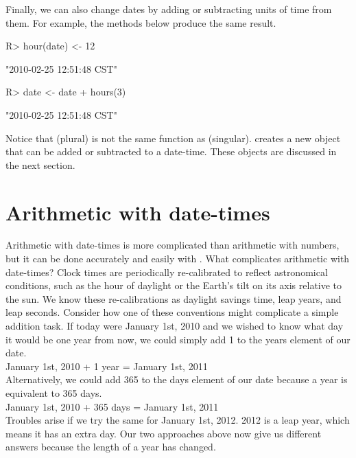 \documentclass[article]{jss}
\begin{document}
Finally, we can also change dates by adding or subtracting units of time from them. For example, the methods below produce the same result.

\begin{CodeInput}
R> hour(date) <-  12
\end{CodeInput}
\begin{CodeOutput}
[1] "2010-02-25 12:51:48 CST"
\end{CodeOutput}

\begin{CodeInput}
R> date <- date + hours(3)
\end{CodeInput}
\begin{CodeOutput}
[1] "2010-02-25 12:51:48 CST"
\end{CodeOutput}

Notice that  (plural) is not the same function as  (singular).  creates a new object that can be added or subtracted to a  date-time. These objects are discussed in the next section.

\section{Arithmetic with date-times}
\label{sec:types}
Arithmetic with date-times is more complicated than arithmetic with numbers, but it can be done accurately and easily with . What complicates arithmetic with date-times? Clock times are periodically re-calibrated to reflect astronomical conditions, such as the hour of daylight or the Earth's tilt on its axis relative to the sun. We know these re-calibrations as daylight savings time, leap years, and leap seconds. Consider how one of these conventions might complicate a simple addition task. If today were January 1st, 2010 and we wished to know what day it would be one year from now, we could simply add 1 to the years element of our date.\\

January 1st, 2010 + 1 year = January 1st, 2011\\

Alternatively, we could add 365 to the days element of our date because a year is equivalent to 365 days. \\

January 1st, 2010 + 365 days = January 1st, 2011\\

Troubles arise if we try the same for January 1st, 2012. 2012 is a leap year, which means it has an extra day. Our two approaches above now give us different answers because the length of a year has changed.\\
\end{document}
